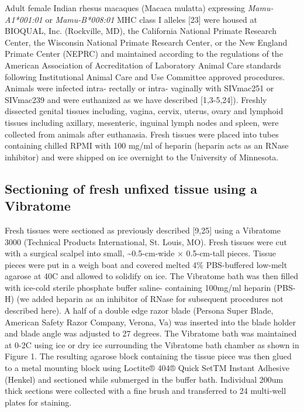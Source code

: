 \documentclass{article}
\begin{document}
Adult female Indian rhesus macaques (Macaca mulatta) expressing \textit{Mamu- A1*001:01} or \textit{Mamu-B*008:01} MHC class I alleles [23] were housed at BIOQUAL, Inc. (Rockville, MD), the California National Primate Research Center, the Wisconsin National Primate Research Center, or the New England Primate Center (NEPRC) and maintained according to the regulations of the American Association of Accreditation of Laboratory Animal Care standards following Institutional Animal Care and Use Committee approved procedures. Animals were infected intra- rectally or intra- vaginally with SIVmac251 or SIVmac239 and were euthanized as we have described [1,3-5,24]). Freshly dissected genital tissues including, vagina, cervix, uterus, ovary and lymphoid tissues including axillary, mesenteric, inguinal lymph nodes and spleen, were collected from animals after euthanasia. Fresh tissues were placed into tubes containing chilled RPMI with 100 mg/ml of heparin (heparin acts as an RNase inhibitor) and were shipped on ice overnight to the University of Minnesota.


\subsection*{Sectioning of fresh unfixed tissue using a Vibratome}

Fresh tissues were sectioned as previously described [9,25] using a Vibratome 3000 (Technical Products International, St. Louis, MO). Fresh tissues were cut with a surgical scalpel into small, \textasciitilde{}0.5-cm-wide × 0.5-cm-tall pieces. Tissue pieces were put in a weigh boat and covered melted 4\% PBS-buffered low-melt agarose at 40C and allowed to solidify on ice. The Vibratome bath was then filled with ice-cold sterile phosphate buffer saline- containing 100mg/ml heparin (PBS-H) (we added heparin as an inhibitor of RNase for subsequent procedures not described here). A half of a double edge razor blade (Persona Super Blade, American Safety Razor Company, Verona, Va) was inserted into the blade holder and blade angle was adjusted to 27 degrees. The Vibratome bath was maintained at 0-2C using ice or dry ice surrounding the Vibratome bath chamber as shown in Figure 1. The resulting agarose block containing the tissue piece was then glued to a metal mounting block using Loctite® 404® Quick SetTM Instant Adhesive (Henkel) and sectioned while submerged in the buffer bath. Individual 200um thick sections were collected with a fine brush and transferred to 24 multi-well plates for staining.
\end{document}
